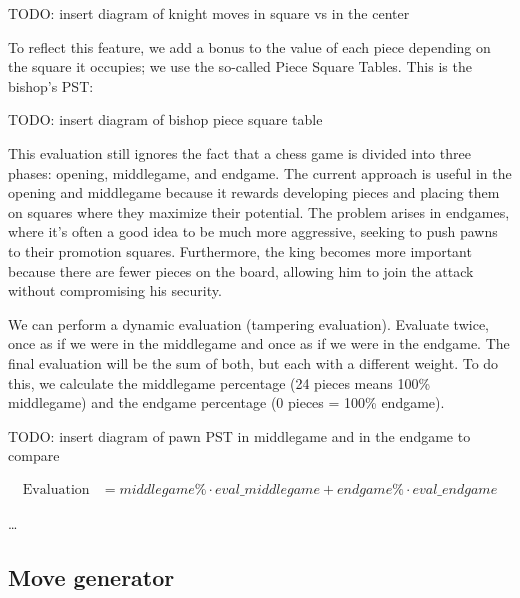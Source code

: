 TODO: insert diagram of knight moves in square vs in the center

\vspace{1em}

To reflect this feature, we add a bonus to the value of each piece depending on the square it occupies; we use the so-called Piece Square Tables. This is the bishop's PST:

\vspace{1em}

TODO: insert diagram of bishop piece square table

\vspace{1em}

This evaluation still ignores the fact that a chess game is divided into three phases: opening, middlegame, and endgame. The current approach is useful in the opening and middlegame because it rewards developing pieces and placing them on squares where they maximize their potential. The problem arises in endgames, where it's often a good idea to be much more aggressive, seeking to push pawns to their promotion squares. Furthermore, the king becomes more important because there are fewer pieces on the board, allowing him to join the attack without compromising his security.

\vspace{1em}

\noindent We can perform a dynamic evaluation (tampering evaluation). Evaluate twice, once as if we were in the middlegame and once as if we were in the endgame. The final evaluation will be the sum of both, but each with a different weight. To do this, we calculate the middlegame percentage (24 pieces means 100\% middlegame) and the endgame percentage (0 pieces = 100\% endgame).

\vspace{1em}

TODO: insert diagram of pawn PST in middlegame and in the endgame to compare

\begin{align*}
\text{Evaluation} &= middlegame\% \cdot eval\_middlegame + endgame\% \cdot eval\_endgame
\end{align*}

\ldots

\subsection{Move generator}
~\cite{GenerateLegalMovesEfficiently}

\vspace{1em}

